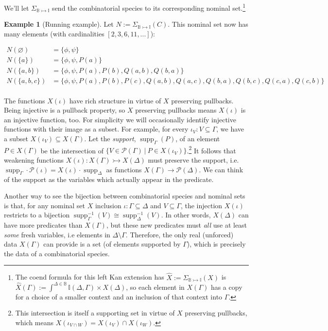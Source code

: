 \documentclass{article}
\theoremstyle{definition}
\newtheorem{example}{Example}[section]
\newcommand{\BB}{\mathbb{B}}
\newcommand{\II}{\mathbb{I}}
\newcommand{\cP}{\mathcal{P}}
\newcommand{\supp}{\operatorname{supp}}
\begin{document}
We'll let $\Sigma_{\BB\rightarrowtail \II}$ send the combinatorial species to its corresponding nominal set.\footnote{The coend formula for this left Kan extension has $\hat X:=\Sigma_{\BB\rightarrowtail \II}(X)$ is $\hat X(\Gamma):=\int^{\Delta \in \BB}\II(\Delta,\Gamma)\times X(\Delta)$, so each element in $X(\Gamma)$ has a copy for a choice of a smaller context and an inclusion of that context into $\Gamma$.} 


\begin{example}[Running example]
\label{ex:runnom}
Let $N:=\Sigma_{\BB\rightarrowtail \II}(C)$. This nominal set now has many elements (with cardinalities $[2,3,6,11,...]$): 

 \begin{align*}
N(\varnothing)&=\{\phi,\psi\}\\
N(\{a\})&=\{\phi,\psi,P(a)\}\\
N(\{a,b\}) &=\{\phi,\psi,P(a),P(b),Q(a,b),Q(b,a)\}\\
N(\{a,b,c\})&= \{\phi,\psi,P(a),P(b),P(c),Q(a,b),Q(a,c), Q(b,a),Q(b,c),Q(c,a),Q(c,b)\}\\
    \end{align*}

\end{example}

The functions $X(\iota)$ have rich structure in virtue of $X$ preserving pullbacks. 
Being injective is a pullback property, so $X$ preserving pullbacks means $X(\iota)$ is an injective function, too. 
For simplicity we will occasionally identify injective functions with their image as a subset. 
For example, for every $\iota_V\colon V \subseteq \Gamma$, we have a subset $X(\iota_V) \subseteq X(\Gamma)$. 
Let the {\it support}, $\supp_\Gamma(P)$, of an element $P \in X(\Gamma)$ be the intersection of $\{V \in \cP(\Gamma)\ |\ P \in X(\iota_V)\}$.\footnote{This intersection is itself a supporting set in virtue of $X$ preserving pullbacks, which means $X(\iota_{V \cap W})= X(\iota_V) \cap X(\iota_{W})$.} 
It follows that weakening functions $X(\iota)\colon X(\Gamma)\rightarrowtail X(\Delta)$ must preserve the support, i.e. $\supp_\Gamma\cdot \cP(\iota)=X(\iota)\cdot \supp_{\Delta}$ as functions $X(\Gamma)\to \cP(\Delta)$. 
We can think of the support as the variables which actually appear in the predicate. 


    
Another way to see the bijection between combinatorial species and nominal sets is that, for any nominal set $X$ inclusion $\iota\colon \Gamma \subseteq \Delta$ and $V \subseteq \Gamma$, the injection $X(\iota)$ restricts to a bijection $\supp_\Gamma^{-1}(V) \cong \supp^{-1}_\Delta(V)$. 
In other words, $X(\Delta)$ can have more predicates than $X(\Gamma)$, but these new predicates must {\it all} use at least {\it some} fresh variables, i.e elements in $\Delta\setminus \Gamma$. 
Therefore, the only real (unforced) data $X(\Gamma)$ can provide is a set (of elements supported by $\Gamma$), which is precisely the data of a combinatorial species. 
\end{document}

